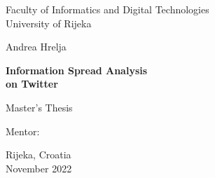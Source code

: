 \begin{center}
    \Large
    Faculty of Informatics and Digital Technologies \\
    University of Rijeka \\
    
    \vfill
    
    \large
    Andrea Hrelja
    
    \vspace{0.5cm}
    
    \Huge
    \textbf{
        Information Spread Analysis \\
        on Twitter
    }
        
    \vspace{0.5cm}
    \large
    Master's Thesis
        
    \vfill
    
    \begin{flushleft}
    Mentor: \mentor
    \end{flushleft}
        
    \vfill

    \vspace{0.8cm}
        
    \large
    Rijeka, Croatia \\
    November 2022
        
\end{center}

